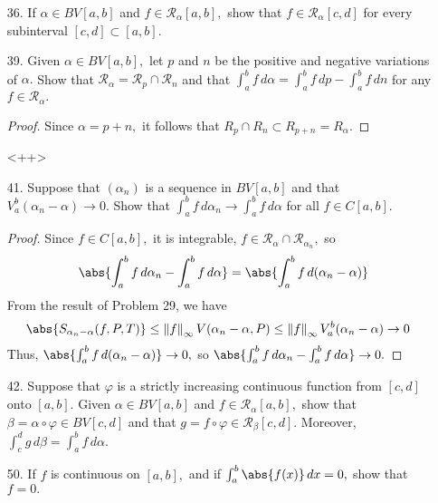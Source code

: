 \documentclass{article}
\begin{document}
\begin{itemize}
	\item[36.] If $\alpha\in BV[a, b]$ and $f\in \mathcal R_\alpha[a, b],$ show that $f\in \mathcal R_\alpha[c, d]$ for every subinterval $[c, d]\subset[a, b].$

	\item[39.] Given $\alpha\in BV[a, b],$ let $p$ and $n$ be the positive and negative variations of $\alpha.$ Show that $\mathcal R_\alpha = \mathcal R_p \cap \mathcal R_n$ and that $\int_a^b f\, d\alpha = \int_a^b f\, dp - \int_a^b f\, dn$ for any $f\in\mathcal R_\alpha.$
		\begin{proof}
			Since $\alpha=p+n,$ it follows that $R_p\cap R_n\subset R_{p+n}=R_{\alpha}.$
		\end{proof}<++>

	\item[41.] Suppose that $(\alpha_n)$ is a sequence in $BV[a, b]$ and that $V_a^b(\alpha_n-\alpha)\to 0.$ Show that $\int_a^b f\, d\alpha_n\to\int_a^b f\, d\alpha$ for all $f\in C[a, b].$
		\begin{proof}
			Since $f\in C[a, b],$ it is integrable, $f\in \mathcal R_\alpha\cap \mathcal R_{\alpha_n},$ so
			\begin{align*}
				\abs{\int_a^b f\, d\alpha_n - \int_a^b f\, d\alpha} = \abs{\int_a^b f\, d(\alpha_n-\alpha)} 
			\end{align*}
			From the result of Problem 29, we have
			\begin{align*}
				\abs{S_{\alpha_n-\alpha}(f, P, T)} &\le \left\lVert f \right\rVert_\infty V(\alpha_n-\alpha, P)\le \left\lVert f \right\rVert_\infty V_a^b (\alpha_n-\alpha) \to 0
			\end{align*}
			Thus, $\abs{\int_a^b f\, d(\alpha_n-\alpha)}\to 0,$ so $\abs{\int_a^b f\, d\alpha_n-\int_a^b f\, d\alpha} \to 0.$
		\end{proof}

	\item[42.] Suppose that $\varphi$ is a strictly increasing continuous function from $[c, d]$ onto $[a, b].$ Given $\alpha\in BV[a, b]$ and $f\in \mathcal R_\alpha[a, b],$ show that $\beta=\alpha\circ\varphi\in BV[c, d]$ and that $g=f\circ \varphi\in \mathcal R_\beta[c, d].$ Moreover, $\int_c^d g\, d\beta=\int_a^b f\, d\alpha.$

	\item[50.] If $f$ is continuous on $[a, b],$ and if $\int_a^b\abs{f(x)}\, dx=0,$ show that $f=0.$
		
\end{itemize}
\end{document}
